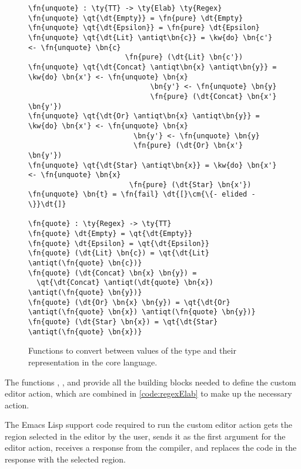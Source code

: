 \begin{figure}[ht]
\begin{Verbatim}
\fn{unquote} : \ty{TT} -> \ty{Elab} \ty{Regex}
\fn{unquote} \qt{\dt{Empty}} = \fn{pure} \dt{Empty}
\fn{unquote} \qt{\dt{Epsilon}} = \fn{pure} \dt{Epsilon}
\fn{unquote} \qt{\dt{Lit} \antiqt\bn{c}} = \kw{do} \bn{c'} <- \fn{unquote} \bn{c}
                       \fn{pure} (\dt{Lit} \bn{c'})
\fn{unquote} \qt{\dt{Concat} \antiqt\bn{x} \antiqt\bn{y}} = \kw{do} \bn{x'} <- \fn{unquote} \bn{x}
                             \bn{y'} <- \fn{unquote} \bn{y}
                             \fn{pure} (\dt{Concat} \bn{x'} \bn{y'})
\fn{unquote} \qt{\dt{Or} \antiqt\bn{x} \antiqt\bn{y}} = \kw{do} \bn{x'} <- \fn{unquote} \bn{x}
                         \bn{y'} <- \fn{unquote} \bn{y}
                         \fn{pure} (\dt{Or} \bn{x'} \bn{y'})
\fn{unquote} \qt{\dt{Star} \antiqt\bn{x}} = \kw{do} \bn{x'} <- \fn{unquote} \bn{x}
                        \fn{pure} (\dt{Star} \bn{x'})
\fn{unquote} \bn{t} = \fn{fail} \dt{[}\cm{\{- elided -\}}\dt{]}

\fn{quote} : \ty{Regex} -> \ty{TT}
\fn{quote} \dt{Empty} = \qt{\dt{Empty}}
\fn{quote} \dt{Epsilon} = \qt{\dt{Epsilon}}
\fn{quote} (\dt{Lit} \bn{c}) = \qt{\dt{Lit} \antiqt(\fn{quote} \bn{c})}
\fn{quote} (\dt{Concat} \bn{x} \bn{y}) =
  \qt{\dt{Concat} \antiqt(\dt{quote} \bn{x}) \antiqt(\fn{quote} \bn{y})}
\fn{quote} (\dt{Or} \bn{x} \bn{y}) = \qt{\dt{Or} \antiqt(\fn{quote} \bn{x}) \antiqt(\fn{quote} \bn{y})}
\fn{quote} (\dt{Star} \bn{x}) = \qt{\dt{Star} \antiqt(\fn{quote} \bn{x})}
\end{Verbatim}
\caption{Functions to convert between values of the  type and their representation in the core language.}
\label{code:regexQuote}
\end{figure}

The functions , , and  provide all the
building blocks needed to define the custom editor action, which are combined in
\autoref{code:regexElab} to make up the necessary \Elab{} action.

The Emacs Lisp support code required to run the custom editor action gets the
region selected in the editor by the user, sends it as the first argument for
the  editor action, receives a response from the compiler,
and replaces the code in the response with the selected region.

